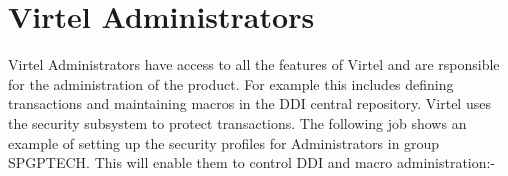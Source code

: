 \documentclass[letterpaper,10pt,english]{sphinxmanual}
\begin{document}

\newpage


\section{Virtel Administrators}
\label{\detokenize{Installation_Guide:virtel-administrators}}\label{\detokenize{Installation_Guide:index-180}}
Virtel Administrators have access to all the features of Virtel and are rsponsible for the administration of the product. For example this includes defining transactions and maintaining macros in the DDI central repository. Virtel uses the security subsystem to protect transactions. The following job shows an example of setting up the security profiles for Administrators in group SPGPTECH. This will enable them to control DDI and macro administration:-
\end{document}
